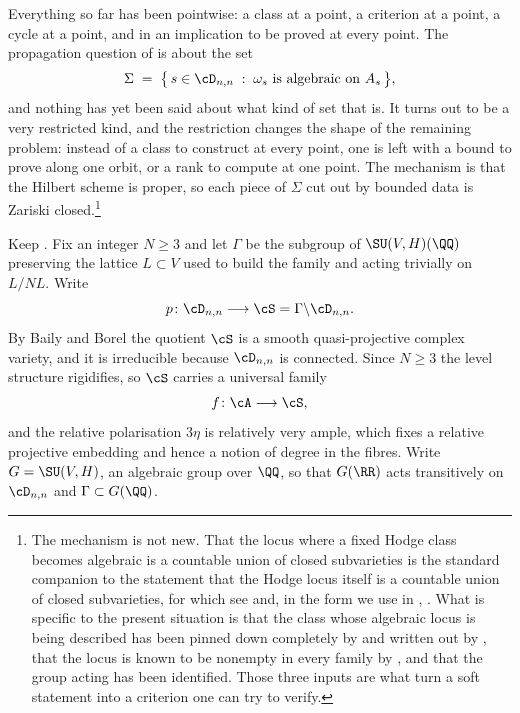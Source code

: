 Everything so far has been pointwise: a class at a point, a criterion at a
point, a cycle at a point, and in  an implication to be
proved at every point. The propagation question of  is about
the set
\[
  \Sigma \;=\; \bigl\{\,s\in\cD_{n,n} \;:\;
    \omega_{s}\ \text{is algebraic on}\ A_{s}\,\bigr\},
\]
and nothing has yet been said about what kind of set that is. It turns out to
be a very restricted kind, and the restriction changes the shape of the
remaining problem: instead of a class to construct at every point, one is left
with a bound to prove along one orbit, or a rank to compute at one point.
The mechanism is that the Hilbert scheme is proper, so each piece of $\Sigma$
cut out by bounded data is Zariski closed.\footnote{The mechanism is not new.
That the locus where a fixed Hodge class becomes algebraic is a countable
union of closed subvarieties is the standard companion to the statement that
the Hodge locus itself is a countable union of closed subvarieties, for which
see \cite[Chapter~5]{Voi03} and, in the form we use in ,
\cite{CDK95}. What is specific to the present situation is that the class
whose algebraic locus is being described has been pinned down completely by
 and written out by , that the locus
is known to be nonempty in every family by , and that
the group acting has been identified. Those three inputs are what turn a soft
statement into a criterion one can try to verify.}

\begin{setupenv}\label{setup:shimura}
Keep . Fix an integer $N\ge3$ and let $\Gamma$ be the
subgroup of $\SU(V,H)(\QQ)$ preserving the lattice $L\subset V$ used to build
the family and acting trivially on $L/NL$. Write
\[
  p\colon\cD_{n,n}\longrightarrow\cS=\Gamma\backslash\cD_{n,n} .
\]
By Baily and Borel \cite{BB66} the quotient $\cS$ is a smooth quasi-projective
complex variety, and it is irreducible because $\cD_{n,n}$ is connected. Since
$N\ge3$ the level structure rigidifies, so $\cS$ carries a universal family
\[
  f\colon\cA\longrightarrow\cS,
\]
and the relative polarisation $3\eta$ is relatively very ample, which fixes a
relative projective embedding and hence a notion of degree in the fibres.
Write $G=\SU(V,H)$, an algebraic group over $\QQ$, so that
$G(\RR)$ acts transitively on $\cD_{n,n}$ and $\Gamma\subset G(\QQ)$.
\end{setupenv}

